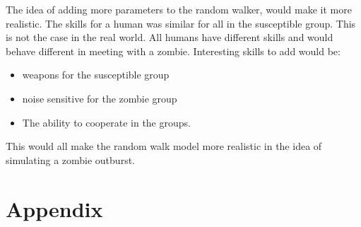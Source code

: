 \documentclass[%
twoside,                 %
final,                   %
chapterprefix=true,      %
open=right               %
10pt]{book}
\begin{document}
\vspace{3mm}




\vspace{3mm}


The idea of adding more parameters to the random walker, would make it more realistic. The skills for a human was similar for all in the susceptible group. This is not the case in the real world. All humans have different skills and would behave different in meeting with a zombie. Interesting skills to add would be:
\begin{itemize}
\item weapons for the susceptible group

\item noise sensitive for the zombie group

\item The ability to cooperate in the groups.
\end{itemize}

\noindent
This would all make the random walk model more realistic in the idea of simulating a zombie outburst.




\chapter{Appendix}
\end{document}
